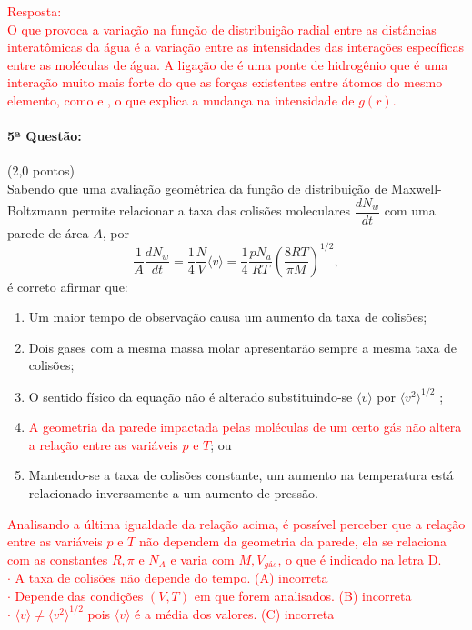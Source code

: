 \documentclass[12pt,a4paper]{article}
\begin{document}
\textcolor{red}{Resposta: \\
O que provoca a variação na função de distribuição radial entre as distâncias interatômicas da água é a variação entre as intensidades das interações específicas entre as moléculas de água. A ligação de  é uma ponte de hidrogênio que é uma interação muito mais forte do que as forças existentes entre átomos do mesmo elemento, como  e , o que explica a mudança na intensidade de $g(r)$. } \\[0.5cm]

\newpage

\paragraph{5ª Questão:} (2,0 pontos)\\ [0.5cm]

Sabendo que uma avaliação geométrica da função de distribuição de Maxwell-Boltzmann permite relacionar a taxa das colisões moleculares $\dfrac{dN_{w}}{dt}$ com uma parede de área $A$, por
\begin{equation*}
    \dfrac{1}{A} \dfrac{dN_{w}}{dt} = \dfrac{1}{4} \dfrac{N}{V} \langle v \rangle = \dfrac{1}{4} \dfrac{pN_{a}}{RT} \left( \dfrac{8RT}{\pi M} \right)^{1/2},
\end{equation*} é correto afirmar que:

\begin{enumerate} [label = (\alph*)]
    \item Um maior tempo de observação causa um aumento da taxa de colisões;
    \item Dois gases com a mesma massa molar apresentarão sempre a mesma taxa de colisões;
    \item O sentido físico da equação não é alterado substituindo-se $\langle v \rangle$ por $\langle v^{2} \rangle^{1/2}$ ;
    \item \textcolor{red}{A geometria da parede impactada pelas moléculas de um certo gás não altera a relação entre as variáveis $p$ e $T$}; ou
    \item Mantendo-se a taxa de colisões constante, um aumento na temperatura está relacionado inversamente a um aumento de pressão.
    
\end{enumerate}

\textcolor{red}{Analisando a última igualdade da relação acima, é possível perceber que a relação entre as variáveis $p$ e $T$ não dependem da geometria da parede, ela se relaciona com as constantes $R, \pi $ e $N_{A}$ e varia com $M, V_{gás}$, o que é indicado na letra D.\\
$\cdot$ A taxa de colisões não depende do tempo. (A) incorreta\\
$\cdot$ Depende das condições $(V, T)$ em que forem analisados. (B) incorreta\\
$\cdot$ $\langle v \rangle \neq \langle v^{2} \rangle^{1/2}$ pois $\langle v \rangle$ é a média dos valores. (C) incorreta}
\end{document}
